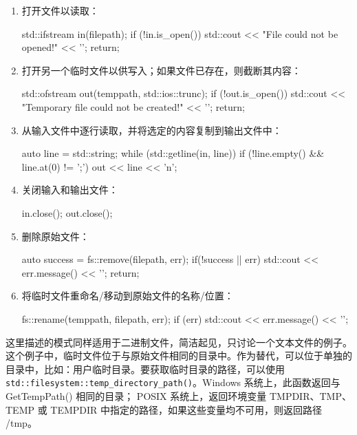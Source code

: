 \begin{enumerate}
\item
打开文件以读取：

\begin{cpp}
std::ifstream in(filepath);
if (!in.is_open())
{
    std::cout << "File could not be opened!" << '\n';
    return;
}
\end{cpp}

\item
打开另一个临时文件以供写入；如果文件已存在，则截断其内容：

\begin{cpp}
std::ofstream out(temppath, std::ios::trunc);
if (!out.is_open())
{
    std::cout << "Temporary file could not be created!" << '\n';
    return;
}
\end{cpp}

\item
从输入文件中逐行读取，并将选定的内容复制到输出文件中：

\begin{cpp}
auto line = std::string{};
while (std::getline(in, line))
{
    if (!line.empty() && line.at(0) != ';')
    {
        out << line << 'n';
    }
}
\end{cpp}

\item
关闭输入和输出文件：

\begin{cpp}
in.close();
out.close();
\end{cpp}

\item
删除原始文件：

\begin{cpp}
auto success = fs::remove(filepath, err);
if(!success || err)
{
    std::cout << err.message() << '\n';
    return;
}
\end{cpp}

\item
将临时文件重命名/移动到原始文件的名称/位置：

\begin{cpp}
fs::rename(temppath, filepath, err);
if (err)
{
    std::cout << err.message() << '\n';
}
\end{cpp}
\end{enumerate}


这里描述的模式同样适用于二进制文件，简洁起见，只讨论一个文本文件的例子。这个例子中，临时文件位于与原始文件相同的目录中。作为替代，可以位于单独的目录中，比如：用户临时目录。要获取临时目录的路径，可以使用 \verb|std::filesystem::temp_directory_path()|。Windows 系统上，此函数返回与 GetTempPath() 相同的目录； POSIX 系统上，返回环境变量 TMPDIR、TMP、TEMP 或 TEMPDIR 中指定的路径，如果这些变量均不可用，则返回路径 /tmp。

